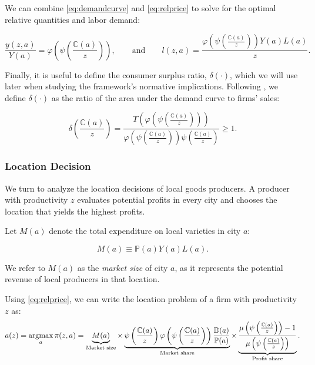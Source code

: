 We can combine \eqref{eq:demandcurve} and \eqref{eq:relprice} to solve for the optimal relative quantities and labor demand:

\begin{equation}\label{eq:relq}
	\frac{y(z,a)}{Y(a)} = \varphi\left(\psi\left(\frac{\mathbb{C}(a)}{z}\right)\right), \qquad \text{and} \qquad l(z,a) = \frac{\varphi\left(\psi\left(\frac{\mathbb{C}(a)}{z}\right)\right) Y(a) L(a)}{z}.
\end{equation}

Finally, it is useful to define the consumer surplus ratio, $\delta(\cdot)$, which we will use later when studying the framework’s normative implications. Following \textcite{BaqaeeFarhi&Sangani23}, we define $\delta(\cdot)$ as the ratio of the area under the demand curve to firms’ sales:

\begin{equation}\label{eq:deltadef}
\delta\left(\frac{\mathbb{C}(a)}{z}\right) = \frac{\Upsilon\left( \varphi\left(\psi\left(\frac{\mathbb{C}(a)}{z}\right)\right) \right)}{\varphi\left(\psi\left(\frac{\mathbb{C}(a)}{z}\right)\right) \psi\left(\frac{\mathbb{C}(a)}{z}\right)} \geq 1.
\end{equation}

\subsubsection{Location Decision}\label{s:locdec}
We turn to analyze the location decisions of local goods producers. A producer with productivity $z$ evaluates potential profits in every city and chooses the location that yields the highest profits.  

Let $M(a)$ denote the total expenditure on local varieties in city $a$:  

\begin{equation}
    M(a) \equiv \mathbb{P}(a) Y(a) L(a).
\end{equation}

We refer to $M(a)$ as the \textit{market size} of city $a$, as it represents the potential revenue of local producers in that location.  

Using \eqref{eq:relprice}, we can write the location problem of a firm with productivity $z$ as:
\begin{equation}\label{eq:locfnt}
	a(z) = \operatorname*{argmax}_a \pi(z,a) = \underbrace{M(a)}_{\text{Market size}} \times  \underbrace{ \psi\left(\frac{\mathbb{C}(a)}{z}\right) \varphi\left(\psi\left(\frac{\mathbb{C}(a)}{z}\right)\right)\frac{\mathbb{D}(a)}{\mathbb{P}(a)}}_{\text{Market share}} \times \underbrace{\frac{\mu\left(\psi\left(\frac{\mathbb{C}(a)}{z}\right)\right) - 1}{\mu\left(\psi\left(\frac{\mathbb{C}(a)}{z}\right)\right)}}_{\substack{\text{Profit share}}}.
\end{equation}

